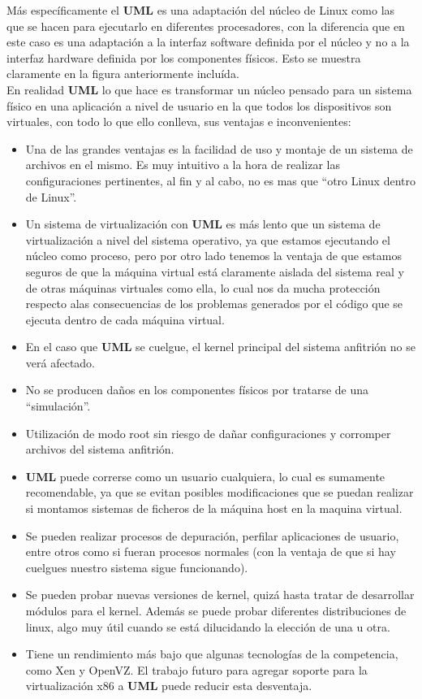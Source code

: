 \documentclass[11pt,twoside,titlepage,a4paper]{article}
\theoremstyle{definition}
\theoremstyle{plain_rojo}
\theoremstyle{remark}
\begin{document}
Más específicamente el \textbf{UML} es una adaptación del núcleo de Linux 
como las que se hacen para ejecutarlo en diferentes procesadores, con la 
diferencia que en este caso es una adaptación a la interfaz software definida 
por el núcleo y no a la interfaz hardware definida por los componentes 
físicos. Esto se muestra claramente en la figura anteriormente incluída.
\\

En realidad \textbf{UML} lo que hace es transformar un núcleo pensado para un 
sistema físico en una aplicación a nivel de usuario en la que todos los 
dispositivos son virtuales, con todo lo que ello conlleva, sus ventajas e 
inconvenientes:

\begin{itemize}[font={\color{rojooscuro}\bfseries}]
\item Una de las grandes ventajas es la facilidad de uso y montaje de un 
sistema de archivos en el mismo. Es muy intuitivo a la hora de realizar las 
configuraciones pertinentes, al fin y al cabo, no es mas que “otro Linux 
dentro de Linux”.
\item Un sistema de virtualización con \textbf{UML} es más lento que un 
sistema de virtualización a nivel del sistema operativo, ya que estamos 
ejecutando el núcleo como proceso, pero por otro lado tenemos la ventaja de 
que estamos seguros de que la máquina virtual está claramente aislada del 
sistema real y de otras máquinas virtuales como ella, lo cual nos da mucha 
protección respecto alas consecuencias de los problemas generados por el 
código que se ejecuta dentro de cada máquina virtual.
\item En el caso que \textbf{UML} se cuelgue, el kernel principal del sistema 
anfitrión no se verá afectado.
\item No se producen daños en los componentes físicos por tratarse de una 
“simulación”.
\item Utilización de modo root sin riesgo de dañar configuraciones y 
corromper archivos del sistema anfitrión.
\item \textbf{UML} puede correrse como un usuario cualquiera, lo cual es 
sumamente recomendable, ya que se evitan posibles modificaciones que se 
puedan realizar si montamos sistemas de ficheros de la máquina host en la 
maquina virtual.
\item Se pueden realizar procesos de depuración, perfilar aplicaciones de 
usuario, entre otros como si fueran procesos normales (con la ventaja de que 
si hay cuelgues nuestro sistema sigue funcionando).
\item Se pueden probar nuevas versiones de kernel, quizá hasta tratar de 
desarrollar módulos para el kernel. Además se puede probar diferentes 
distribuciones de linux, algo muy útil cuando se está dilucidando la elección 
de una u otra.
\item Tiene un rendimiento más bajo que algunas tecnologías de la
competencia, como Xen y OpenVZ. El trabajo futuro para agregar soporte para la virtualización x86 a \textbf{UML} puede reducir esta desventaja.
\end{itemize}
\end{document}

